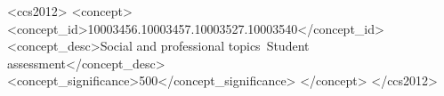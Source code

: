 

\begin{CCSXML}
<ccs2012>
   <concept>
       <concept_id>10003456.10003457.10003527.10003540</concept_id>
       <concept_desc>Social and professional topics~Student assessment</concept_desc>
       <concept_significance>500</concept_significance>
       </concept>
 </ccs2012>
\end{CCSXML}



